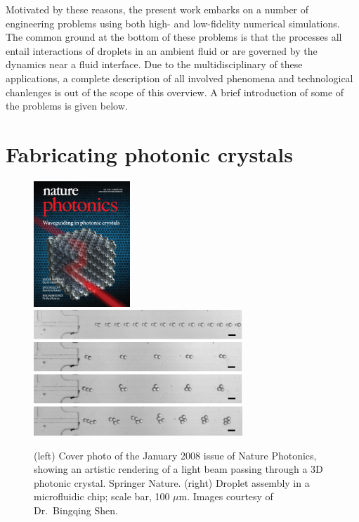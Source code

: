 Motivated by these reasons, the present work embarks on a number of engineering problems using both high- and low-fidelity numerical simulations.
The common ground at the bottom of these problems is that the processes all entail interactions of droplets in an ambient fluid or are governed by the dynamics near a fluid interface.
Due to the multidisciplinary of these applications, a complete description of all involved phenomena and technological chanlenges is out of the scope of this overview.
A brief introduction of some of the problems is given below.



\section{Fabricating photonic crystals}

\begin{figure}%
  \centering
  \includegraphics[height=4.73cm]{photonics_cover.jpg}
  \includegraphics[height=4.73cm]{flow-assist1.png}
  \caption{(left) Cover photo of the January 2008 issue of Nature Photonics, showing an artistic rendering of a light beam passing through a 3D photonic crystal. \textcopyright \enspace Springer Nature. (right) Droplet assembly in a microfluidic chip; scale bar, 100 $\mu$m. Images courtesy of Dr.\ Bingqing Shen.}
  \label{fig:photonic-flow}
\end{figure}

